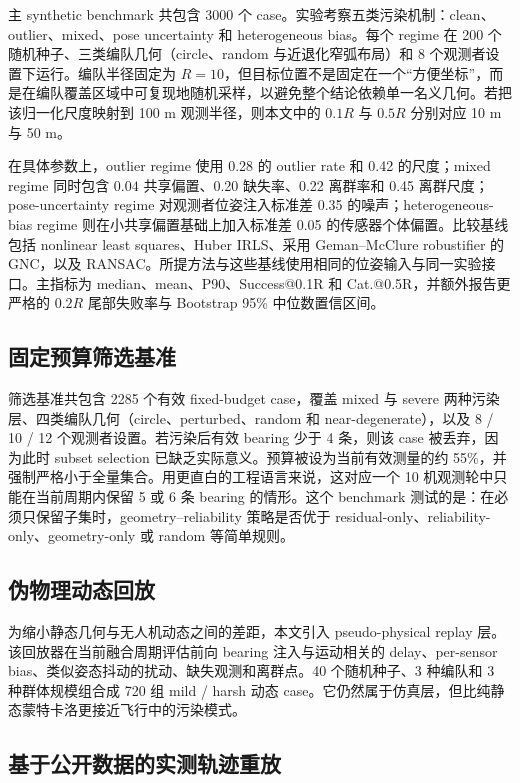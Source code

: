 \documentclass[drones,article,submit,moreauthors]{Definitions/mdpi}
\begin{document}
主 synthetic benchmark 共包含 3000 个 case。实验考察五类污染机制：clean、outlier、mixed、pose uncertainty 和 heterogeneous bias。每个 regime 在 200 个随机种子、三类编队几何（circle、random 与近退化窄弧布局）和 8 个观测者设置下运行。编队半径固定为 $R=10$，但目标位置不是固定在一个“方便坐标”，而是在编队覆盖区域中可复现地随机采样，以避免整个结论依赖单一名义几何。若把该归一化尺度映射到 100 m 观测半径，则本文中的 $0.1R$ 与 $0.5R$ 分别对应 10 m 与 50 m。

在具体参数上，outlier regime 使用 0.28 的 outlier rate 和 0.42 的尺度；mixed regime 同时包含 $0.04$ 共享偏置、0.20 缺失率、0.22 离群率和 0.45 离群尺度；pose-uncertainty regime 对观测者位姿注入标准差 0.35 的噪声；heterogeneous-bias regime 则在小共享偏置基础上加入标准差 0.05 的传感器个体偏置。比较基线包括 nonlinear least squares、Huber IRLS、采用 Geman--McClure robustifier 的 GNC，以及 RANSAC。所提方法与这些基线使用相同的位姿输入与同一实验接口。主指标为 median、mean、P90、Success@0.1R 和 Cat.@0.5R，并额外报告更严格的 $0.2R$ 尾部失败率与 Bootstrap 95\% 中位数置信区间。

\subsection{固定预算筛选基准}

筛选基准共包含 2285 个有效 fixed-budget case，覆盖 mixed 与 severe 两种污染层、四类编队几何（circle、perturbed、random 和 near-degenerate），以及 8 / 10 / 12 个观测者设置。若污染后有效 bearing 少于 4 条，则该 case 被丢弃，因为此时 subset selection 已缺乏实际意义。预算被设为当前有效测量的约 55\%，并强制严格小于全量集合。用更直白的工程语言来说，这对应一个 10 机观测轮中只能在当前周期内保留 5 或 6 条 bearing 的情形。这个 benchmark 测试的是：在必须只保留子集时，geometry--reliability 策略是否优于 residual-only、reliability-only、geometry-only 或 random 等简单规则。

\subsection{伪物理动态回放}

为缩小静态几何与无人机动态之间的差距，本文引入 pseudo-physical replay 层。该回放器在当前融合周期评估前向 bearing 注入与运动相关的 delay、per-sensor bias、类似姿态抖动的扰动、缺失观测和离群点。40 个随机种子、3 种编队和 3 种群体规模组合成 720 组 mild / harsh 动态 case。它仍然属于仿真层，但比纯静态蒙特卡洛更接近飞行中的污染模式。

\subsection{基于公开数据的实测轨迹重放}
\end{document}
